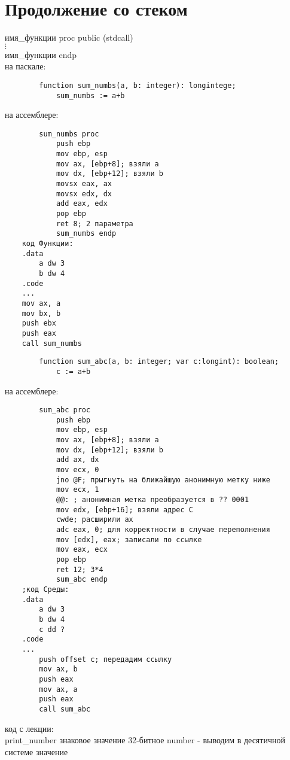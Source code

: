 \documentclass[a4paper, 12pt]{article}
\begin{document}
    \section{Продолжение со стеком}
    \noindent
    имя\_функции proc public (stdcall) \\
    $\vdots$ \\
    имя\_функции endp \\

    на паскале:
    \begin{lstlisting}
        function sum_numbs(a, b: integer): longintege;
            sum_numbs := a+b
    \end{lstlisting}
    на ассемблере:
    \noindent
    \begin{lstlisting}
        sum_numbs proc
            push ebp
            mov ebp, esp
            mov ax, [ebp+8]; взяли a
            mov dx, [ebp+12]; взяли b
            movsx eax, ax
            movsx edx, dx
            add eax, edx
            pop ebp
            ret 8; 2 параметра
            sum_numbs endp
    код Функции:
    .data
        a dw 3
        b dw 4
    .code
    ...
    mov ax, a
    mov bx, b
    push ebx
    push eax
    call sum_numbs
    \end{lstlisting}
    \begin{lstlisting}
        function sum_abc(a, b: integer; var c:longint): boolean;
            c := a+b
    \end{lstlisting}
    на ассемблере:
    \noindent
    \begin{lstlisting}
        sum_abc proc
            push ebp
            mov ebp, esp
            mov ax, [ebp+8]; взяли a
            mov dx, [ebp+12]; взяли b
            add ax, dx
            mov ecx, 0
            jno @F; прыгнуть на ближайшую анонимную метку ниже
            mov ecx, 1
            @@: ; анонимная метка преобразуется в ?? 0001
            mov edx, [ebp+16]; взяли адрес C
            cwde; расширили ax
            adc eax, 0; для корректности в случае переполнения
            mov [edx], eax; записали по ссылке
            mov eax, ecx
            pop ebp
            ret 12; 3*4
            sum_abc endp
    ;код Среды:
    .data
        a dw 3
        b dw 4
        c dd ?
    .code
    ...
        push offset c; передадим ссылку
        mov ax, b
        push eax
        mov ax, a
        push eax
        call sum_abc
    \end{lstlisting}
    код с лекции: \\
    print\_number знаковое значение 32-битное number - выводим в десятичной системе значение
\end{document}
